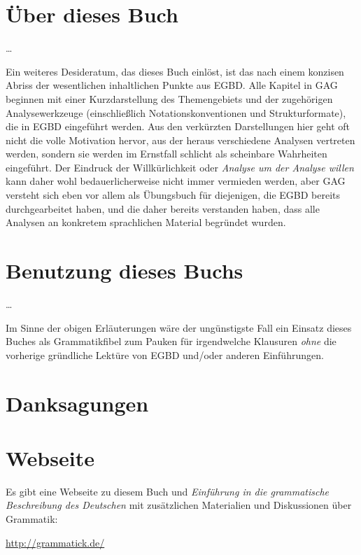 

\section*{Über dieses Buch}
\label{sec:ueberdiesesbuch}

\ldots

Ein weiteres Desideratum, das dieses Buch einlöst, ist das nach einem konzisen Abriss der wesentlichen inhaltlichen Punkte aus EGBD.
Alle Kapitel in GAG beginnen mit einer Kurzdarstellung des Themengebiets und der zugehörigen Analysewerkzeuge (einschließlich Notationskonventionen und Strukturformate), die in EGBD eingeführt werden.
Aus den verkürzten Darstellungen hier geht oft nicht die volle Motivation hervor, aus der heraus verschiedene Analysen vertreten werden, sondern sie werden im Ernstfall schlicht als scheinbare Wahrheiten eingeführt.
Der Eindruck der Willkürlichkeit oder \textit{Analyse um der Analyse willen} kann daher wohl bedauerlicherweise nicht immer vermieden werden, aber GAG versteht sich eben vor allem als Übungsbuch für diejenigen, die EGBD bereits durchgearbeitet haben, und die daher bereits verstanden haben, dass alle Analysen an konkretem sprachlichen Material begründet wurden.

\section*{Benutzung dieses Buchs}
\label{sec:benutzungdiesesbuchs}

\ldots

Im Sinne der obigen Erläuterungen wäre der ungünstigste Fall ein Einsatz dieses Buches als Grammatikfibel zum Pauken für irgendwelche Klausuren \textit{ohne} die vorherige gründliche Lektüre von EGBD und\slash oder anderen Einführungen.

\section*{Danksagungen}
\label{sec:danksagungen}

\section*{Webseite}
\label{sec:webseite}

Es gibt eine Webseite zu diesem Buch und \textit{Einführung in die grammatische Beschreibung des Deutschen} mit zusätzlichen Materialien und Diskussionen über Grammatik:

\begin{center}
  \url{http://grammatick.de/}
\end{center}

